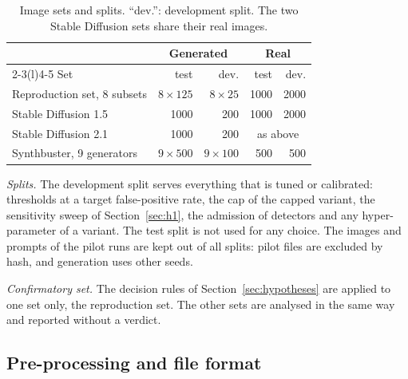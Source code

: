 \begin{table}[!t]
\centering
\caption{Image sets and splits. ``dev.'': development split. The two Stable Diffusion sets share
their real images.}
\label{tab:data}
\small
\setlength{\tabcolsep}{4pt}
\begin{tabular}{@{}lrrrr@{}}
\toprule
 & \multicolumn{2}{c}{Generated} & \multicolumn{2}{c}{Real} \\
\cmidrule(lr){2-3}\cmidrule(l){4-5}
Set & test & dev. & test & dev. \\
\midrule
Reproduction set, 8 subsets  & $8\times125$ & $8\times25$  & 1000 & 2000 \\
Stable Diffusion 1.5         & 1000         & 200          & 1000 & 2000 \\
Stable Diffusion 2.1         & 1000         & 200          & \multicolumn{2}{c}{as above} \\
Synthbuster, 9 generators    & $9\times500$ & $9\times100$ & 500  & 500  \\
\bottomrule
\end{tabular}
\end{table}

\emph{Splits.} The development split serves everything that is tuned or calibrated: thresholds at
a target false-positive rate, the cap of the capped variant, the sensitivity sweep of
Section~\ref{sec:h1}, the admission of detectors and any hyper-parameter of a variant. The test
split is not used for any choice. The images and prompts of the pilot runs are kept out of all
splits: pilot files are excluded by hash, and generation uses other seeds.

\emph{Confirmatory set.} The decision rules of Section~\ref{sec:hypotheses} are applied to one set
only, the reproduction set. The other sets are analysed in the same way and reported without a
verdict.

\subsection{Pre-processing and file format}
\label{sec:preprocessing}

